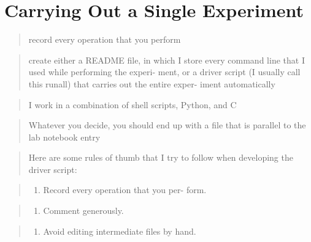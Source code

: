 \documentclass[12pt,]{book}
\providecommand{\tightlist}{%
  \setlength{\itemsep}{0pt}\setlength{\parskip}{0pt}}
\begin{document}
\section{Carrying Out a Single
Experiment}\label{carrying-out-a-single-experiment}

\begin{quote}
record every operation that you perform
\end{quote}

\begin{quote}
create either a README file, in which I store every command line that I
used while performing the experi- ment, or a driver script (I usually
call this runall) that carries out the entire exper- iment automatically
\end{quote}

\begin{quote}
I work in a combination of shell scripts, Python, and C
\end{quote}

\begin{quote}
Whatever you decide, you should end up with a file that is parallel to
the lab notebook entry
\end{quote}

\begin{quote}
Here are some rules of thumb that I try to follow when developing the
driver script:
\end{quote}

\begin{quote}
\begin{enumerate}
\def\labelenumi{\arabic{enumi}.}
\tightlist
\item
  Record every operation that you per- form.
\end{enumerate}
\end{quote}

\begin{quote}
\begin{enumerate}
\def\labelenumi{\arabic{enumi}.}
\setcounter{enumi}{1}
\tightlist
\item
  Comment generously.
\end{enumerate}
\end{quote}

\begin{quote}
\begin{enumerate}
\def\labelenumi{\arabic{enumi}.}
\setcounter{enumi}{2}
\tightlist
\item
  Avoid editing intermediate files by hand.
\end{enumerate}
\end{quote}
\end{document}
